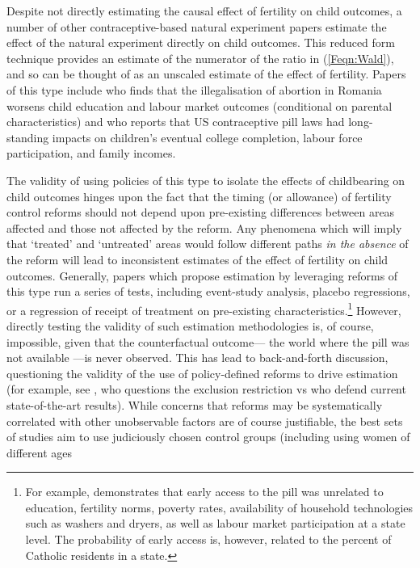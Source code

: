 Despite not directly estimating the causal effect of fertility on child 
outcomes, a number of other contraceptive-based natural experiment papers
estimate the effect of the natural experiment directly on child outcomes.
This reduced form technique provides an estimate of the numerator of the ratio
in (\ref{Feqn:Wald}), and so can be thought of as an unscaled estimate of
the effect of fertility.  Papers of this type include \citet{PopEleches2006} 
who finds that the illegalisation of abortion in Romania worsens child 
education and labour market outcomes (conditional on parental characteristics)
and \citet{Bailey2013} who reports that US contraceptive pill laws had long-%
standing impacts on children's eventual college completion, labour force 
participation, and family incomes.

The validity of using policies of this type to isolate the effects of 
childbearing on child outcomes hinges upon the fact that the timing (or
allowance) of fertility control reforms should not depend upon pre-existing
differences between areas affected and those not affected by the reform. Any
phenomena which will imply that `treated' and `untreated' areas would follow
different paths \emph{in the absence} of the reform will lead to inconsistent
estimates of the effect of fertility on child outcomes.  Generally, papers
which propose estimation by leveraging reforms of this type run a series of
tests, including event-study analysis, placebo regressions, or a regression
of receipt of treatment on pre-existing characteristics.\footnote{For example,
\citet{Bailey2006} demonstrates that early access to the pill was unrelated
to education, fertility norms, poverty rates, availability of household 
technologies such as washers and dryers, as well as labour market participation
at a state level.  The probability of early access is, however, related to the
percent of Catholic residents in a state.}  However, directly testing the
validity of such estimation methodologies is, of course, impossible, given
that the counterfactual outcome--- the world where the pill was not available%
---is never observed.  This has lead to back-and-forth discussion, questioning 
the validity of the use of policy-defined reforms to drive estimation (for 
example, see \citet{Joyce2013}, who questions the exclusion restriction vs 
\citet{Baileyetal2013} who defend current state-of-the-art results).  While 
concerns that reforms may be systematically correlated with other unobservable 
factors are of course justifiable, the best sets of studies aim to use 
judiciously chosen control groups (including using women of different ages 
